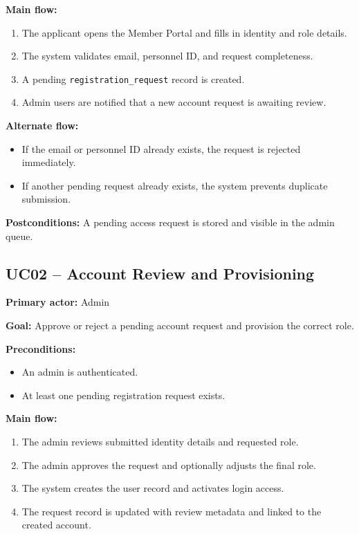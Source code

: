 \documentclass[12pt,letterpaper]{article}
\begin{document}
\textbf{Main flow:}
\begin{enumerate}
    \item The applicant opens the Member Portal and fills in identity and role details.
    \item The system validates email, personnel ID, and request completeness.
    \item A pending \texttt{registration\_request} record is created.
    \item Admin users are notified that a new account request is awaiting review.
\end{enumerate}

\textbf{Alternate flow:}
\begin{itemize}
    \item If the email or personnel ID already exists, the request is rejected immediately.
    \item If another pending request already exists, the system prevents duplicate submission.
\end{itemize}

\textbf{Postconditions:} A pending access request is stored and visible in the admin queue.

\subsection{UC02 -- Account Review and Provisioning}
\textbf{Primary actor:} Admin

\textbf{Goal:} Approve or reject a pending account request and provision the correct role.

\textbf{Preconditions:}
\begin{itemize}
    \item An admin is authenticated.
    \item At least one pending registration request exists.
\end{itemize}

\textbf{Main flow:}
\begin{enumerate}
    \item The admin reviews submitted identity details and requested role.
    \item The admin approves the request and optionally adjusts the final role.
    \item The system creates the user record and activates login access.
    \item The request record is updated with review metadata and linked to the created account.
\end{enumerate}
\end{document}
